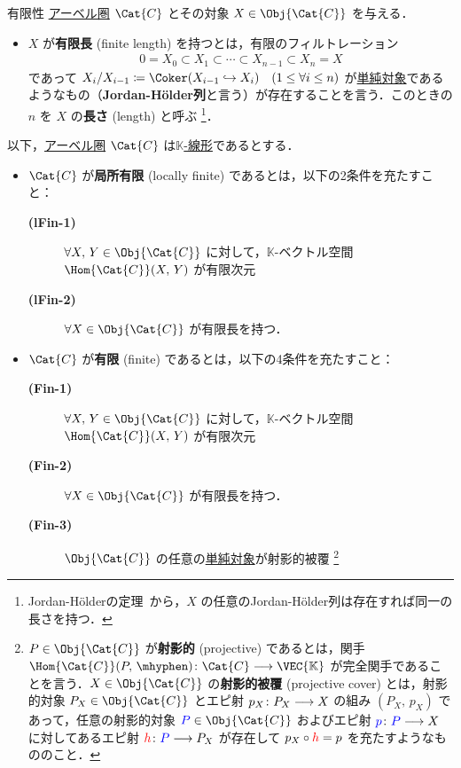 \documentclass[TQFT_main]{subfiles}
\begin{document}
    \begin{mydef}[label=def:finite-abcat]{有限性}
        \hyperref[def:additive-cat]{アーベル圏} $\Cat{C}$ とその対象 $X \in \Obj{\Cat{C}}$ を与える．
        \begin{itemize}
            \item $X$ が\textbf{有限長} (finite length) を持つとは，有限のフィルトレーション
            \begin{align}
                0 = X_0 \subset X_1 \subset \cdots \subset X_{n-1} \subset X_n = X
            \end{align}
            であって $X_i/X_{i-1} \coloneqq \Coker (X_{i-1} \hookrightarrow X_i) \quad (1 \le \forall i \le n)$ が\hyperref[def:semisimple-cat]{単純対象}であるようなもの（\textbf{Jordan-H\"{o}lder列}と言う）が存在することを言う．このときの $n$ を $X$ の\textbf{長さ} (length) と呼ぶ
            \footnote{Jordan-H\"{o}lderの定理~\cite[THEOREM 1.5.4, p.5]{etingof2015tensor}から，$X$ の任意のJordan-H\"{o}lder列は存在すれば同一の長さを持つ．}．
        \end{itemize}
        以下，\hyperref[def:additive-cat]{アーベル圏} $\Cat{C}$ は\hyperref[def:additive-cat]{$\mathbb{K}$-線形}であるとする．
        \begin{itemize}
            \item $\Cat{C}$ が\textbf{局所有限} (locally finite) であるとは，以下の2条件を充たすこと：
            \begin{description}
                \item[\textbf{(lFin-1)}] $\forall X,\, Y \in \Obj{\Cat{C}}$ に対して，$\mathbb{K}$-ベクトル空間 $\Hom{\Cat{C}}(X,\, Y)$ が有限次元
                \item[\textbf{(lFin-2)}] $\forall X \in \Obj{\Cat{C}}$ が有限長を持つ．
            \end{description}
            \item $\Cat{C}$ が\textbf{有限} (finite) であるとは，以下の4条件を充たすこと：
            \begin{description}
                \item[\textbf{(Fin-1)}] $\forall X,\, Y \in \Obj{\Cat{C}}$ に対して，$\mathbb{K}$-ベクトル空間 $\Hom{\Cat{C}}(X,\, Y)$ が有限次元
                \item[\textbf{(Fin-2)}] $\forall X \in \Obj{\Cat{C}}$ が有限長を持つ．
                \item[\textbf{(Fin-3)}] $\Obj{\Cat{C}}$ の任意の\hyperref[def:semisimple-cat]{単純対象}が射影的被覆
                \footnote{$P \in \Obj{\Cat{C}}$ が\textbf{射影的} (projective) であるとは，関手 $\Hom{\Cat{C}}(P,\, \mhyphen) \colon \Cat{C} \lto \VEC{\mathbb{K}}$ が完全関手であることを言う．$X \in \Obj{\Cat{C}}$ の\textbf{射影的被覆} (projective cover) とは，射影的対象 $P_X \in \Obj{\Cat{C}}$ とエピ射 $p_X \colon P_X \longrightarrow X$ の組み $(P_X,\, p_X)$ であって，任意の射影的対象 $\textcolor{blue}{P} \in \Obj{\Cat{C}}$ およびエピ射 $\textcolor{blue}{p} \colon \textcolor{blue}{P} \longrightarrow X$ に対してあるエピ射 $\textcolor{red}{h} \colon \textcolor{blue}{P} \longrightarrow P_X$ が存在して $p_X \circ \textcolor{red}{h} = p$ を充たすようなもののこと．}

\end{description}
\end{itemize}
\end{mydef}
\end{document}
